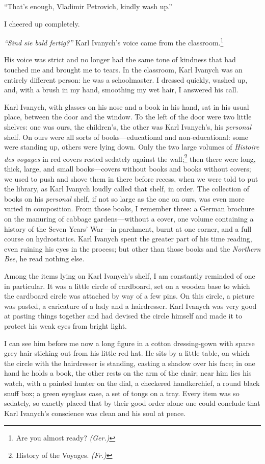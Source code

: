 ``That's enough, Vladimir Petrovich, kindly wash up.'' %

I cheered up completely.

\textit{``Sind sie bald fertig?''} Karl Ivanych's voice came from the classroom.\footnote{Are you almost ready? \textit{(Ger.)}} %

His voice was strict and no longer had the same tone of kindness that had touched me and brought me to tears. In the classroom, Karl Ivanych was an entirely different person: he was a schoolmaster. I dressed quickly, washed up, and, with a brush in my hand, smoothing my wet hair, I answered his call.

Karl Ivanych, with glasses on his nose and a book in his hand, sat in his usual place, between the door and the window. To the left of the door were two little shelves: one was ours, the children's, the other was Karl Ivanych's, his \emph{personal} shelf. On ours were all sorts of books---educational and non-educational: some were standing up, others were lying down. Only the two large volumes of \textit{Histoire des voyages} in red covers rested sedately against the wall;\footnote{History of the Voyages. \textit{(Fr.)}}  then there were long, thick, large, and small books---covers without books and books without covers; we used to push and shove them in there before recess, when we were told to put the library, as Karl Ivanych loudly called that shelf, in order. The collection of books on his \emph{personal} shelf, if not so large as the one on ours, was even more varied in composition. From those books, I remember three: a German brochure on the manuring of cabbage gardens---without a cover, one volume containing a history of the Seven Years' War---in parchment, burnt at one corner, and a full course on hydrostatics. Karl Ivanych spent the greater part of his time reading, even ruining his eyes in the process; but other than those books and the \textit{Northern Bee}, he read nothing else.

Among the items lying on Karl Ivanych's shelf, I am constantly reminded of one in particular. It was a little circle of cardboard, set on a wooden base to which the cardboard circle was attached by way of a few pins. On this circle, a picture was pasted, a caricature of a lady and a hairdresser. Karl Ivanych was very good at pasting things together and had devised the circle himself and made it to protect his weak eyes from bright light.

I can see him before me now a long figure in a cotton dressing-gown with sparse grey hair sticking out from his little red hat. He sits by a little table, on which the circle with the hairdresser is standing, casting a shadow over his face; in one hand he holds a book, the other rests on the arm of the chair; near him lies his watch, with a painted hunter on the dial, a checkered handkerchief, a round black snuff box; a green eyeglass case, a set of tongs on a tray.  Every item was so sedately, so exactly placed that by their good order alone one could conclude that Karl Ivanych's conscience was clean and his soul at peace.

